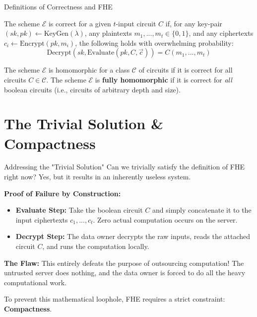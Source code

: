 \documentclass[10pt, aspectratio=169]{beamer}
\begin{document}
\begin{frame}{Definitions of Correctness and FHE}
    \begin{definition}
    The scheme $\mathcal{E}$ is correct for a given $t$-input circuit $C$ if, for any key-pair $(sk,pk)\leftarrow \text{KeyGen}(\lambda)$, any plaintexts $m_{1},...,m_{t}\in\{0,1\}$, and any ciphertexts $c_{i}\leftarrow \text{Encrypt}(pk,m_{i})$, the following holds with overwhelming probability:
    $$\text{Decrypt}(sk,\text{Evaluate}(pk,C,\vec{c}))=C(m_{1},...,m_{t})$$
    \end{definition}
    \pause

    \begin{definition}
    The scheme $\mathcal{E}$ is homomorphic for a class $\mathcal{C}$ of circuits if it is correct for all circuits $C\in\mathcal{C}$. The scheme $\mathcal{E}$ is \textbf{fully homomorphic} if it is correct for \textit{all} boolean circuits (i.e., circuits of arbitrary depth and size).
    \end{definition}
\end{frame}

\section{The Trivial Solution \& Compactness}
\begin{frame}{Addressing the "Trivial Solution"}
    Can we trivially satisfy the definition of FHE right now? Yes, but it results in an inherently useless system.
    \pause
    
    \vspace{0.3cm}
    \textbf{Proof of Failure by Construction:}
    \begin{itemize}
        \item \textbf{Evaluate Step:} Take the boolean circuit $C$ and simply concatenate it to the input ciphertexts $c_{1},...,c_{t}$. Zero actual computation occurs on the server.
        \item \textbf{Decrypt Step:} The data owner decrypts the raw inputs, reads the attached circuit $C$, and runs the computation locally.
    \end{itemize}
    \pause
    
    \vspace{0.3cm}
    \textbf{The Flaw:} This entirely defeats the purpose of outsourcing computation! The untrusted server does nothing, and the data owner is forced to do all the heavy computational work. 
    
    \vspace{0.3cm}
    To prevent this mathematical loophole, FHE requires a strict constraint: \textbf{Compactness}.
\end{frame}
\end{document}
